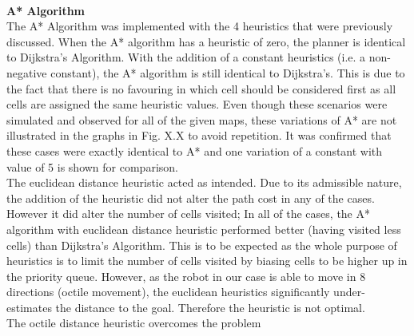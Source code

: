 \documentclass[a4paper,12pt]{article}
\begin{document}
				\\
				\textbf{A* Algorithm}
				\\ 
				The A* Algorithm was implemented with the 4 heuristics that were previously discussed. When the A* algorithm has a heuristic of zero, the planner is identical to Dijkstra's Algorithm. With the addition of a constant heuristics (i.e. a non-negative constant), the A* algorithm is still identical to Dijkstra's. This is due to the fact that there is no favouring in which cell should be considered first as all cells are assigned the same heuristic values. Even though these scenarios were simulated and observed for all of the given maps, these variations of A* are not illustrated in the graphs in Fig. X.X to avoid repetition. It was confirmed that these cases were exactly identical to A* and one variation of a constant with value of 5 is shown for comparison.
				\\
				The euclidean distance heuristic acted as intended. Due to its admissible nature, the addition of the heuristic did not alter the path cost in any of the cases. However it did alter the number of cells visited; In all of the cases, the A* algorithm with euclidean distance heuristic performed better (having visited less cells) than Dijkstra's Algorithm. This is to be expected as the whole purpose of heuristics is to limit the number of cells visited by biasing cells to be higher up in the priority queue. However, as the robot in our case is able to move in 8 directions (octile movement), the euclidean heuristics significantly under-estimates the distance to the goal. Therefore the heuristic is not optimal. 
				\\
				The octile distance heuristic overcomes the problem
\end{document}
